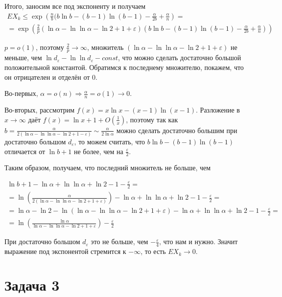\documentclass{article}
\theoremstyle{definition}
\theoremstyle{remark}
\renewcommand{\le}{\leqslant}
\newcommand{\eps}{\varepsilon}
\begin{document}
Итого, заносим все под экспоненту и получаем
\begin{multline*}
	EX_k \le \exp\left( \frac{n}{b} (b \ln b - (b - 1) \ln (b - 1) - \frac{\alpha}{2b} +
	\frac{\alpha}{n}\right) =\\=
	\exp\left(\frac{2}{p}(\ln \alpha - \ln\ln\alpha - \ln 2 + 1 + \eps)\left(b \ln b - (b - 1)\ln(b -
	1) - \frac{\alpha}{2b} + \frac{\alpha}{n} \right)\right)
\end{multline*}

$p = o(1)$, поэтому $\frac{2}{p} \rightarrow \infty$, множитель $(\ln\alpha - \ln\ln\alpha - \ln 2 +
1 + \eps)$ не меньше, чем $\ln d_\eps - \ln \ln d_\eps - const$, что можно сделать достаточно
большой положительной константой. Обратимся к последнему множителю, покажем, что он отрицателен и
отделён от 0.

Во-первых, $\alpha = o(n) \Rightarrow \frac{\alpha}{n} = o(1) \rightarrow 0$.

Во-вторых, рассмотрим $f(x) = x\ln x - (x - 1) \ln (x - 1)$. Разложение в $x \rightarrow
\infty$ даёт $f(x) = \ln x + 1 + O\left(\frac{1}{x}\right)$, поэтому так как
$b = \frac{\alpha}{2(\ln\alpha - \ln\ln \alpha - \ln 2 + 1 - \eps)} \sim \frac{\alpha}{2\ln\alpha}$
можно сделать достаточно большим при достаточно большом $d_\eps$, то можем считать, что
$b \ln b - (b - 1) \ln (b - 1)$ отличается от $\ln b + 1$ не более, чем на $\frac{\eps}{2}$.

Таким образом, получаем, что последний множитель не больше, чем

\begin{multline*}
	\ln b + 1 - \ln \alpha + \ln \ln \alpha + \ln 2 - 1 - \frac{\eps}{2} =\\=
	\ln\left(\frac{\alpha}{2(\ln\alpha -
	\ln\ln \alpha - \ln 2 + 1 + \eps)}\right) - \ln \alpha + \ln\ln \alpha + \ln 2 - 1 -
	\frac{\eps}{2} =\\=
	\ln \alpha - \ln 2 - \ln(\ln \alpha - \ln\ln\alpha - \ln 2 + 1 + \eps) - \ln\alpha + \ln\ln\alpha
	+ \ln 2 - 1 - \frac{\eps}{2} =\\=
	\ln\left(\frac{\ln \alpha}{\ln \alpha - \ln\ln \alpha - \ln 2 + 1 + \eps}\right) - \frac{\eps}{2}
\end{multline*}

При достаточно большом $d_\eps$ это не больше, чем $-\frac{\eps}{4}$, что нам и нужно. Значит
выражение под экспонентой стремится к $-\infty$, то есть $EX_k \rightarrow 0$.

\section*{Задача 3}
\end{document}
